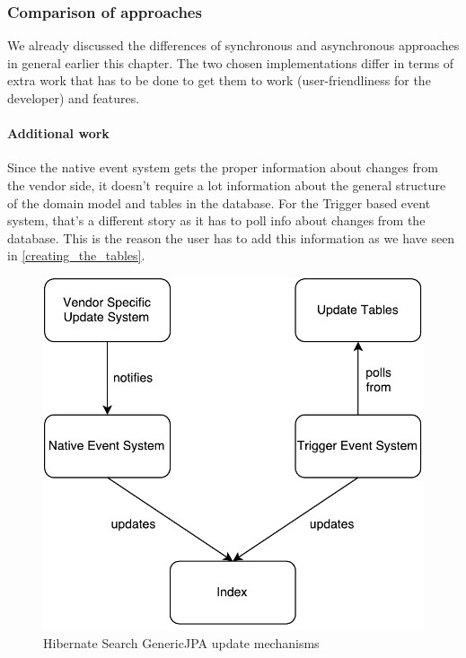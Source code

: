 \pagebreak

\subsubsection{Comparison of approaches}

We already discussed the differences of synchronous and asynchronous approaches in general earlier this chapter. The two chosen implementations differ in terms of extra work that has to be done to get them to work (user-friendliness for the developer) and features.

\paragraph{Additional work}
Since the native event system gets the proper information about changes from the vendor side, it doesn't require a lot information about the general structure of the domain model and tables in the database. For the Trigger based event system, that's a different story as it has to poll info about changes from the database. This is the reason the user has to add this information as we have seen in \ref{creating_the_tables}.
\\
\begin{figure}[ht]
	\centering
	\includegraphics[scale=0.6]{images/UpdateConsumer_Architecture.pdf}
	\caption{Hibernate Search GenericJPA update mechanisms}
	\label{updateconsumer_architecture}
\end{figure}

